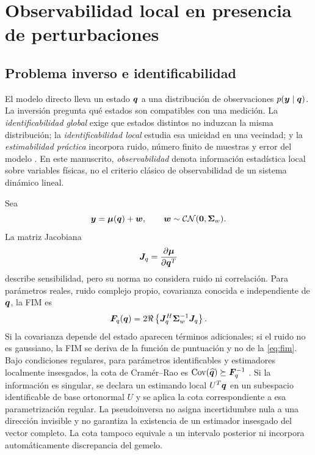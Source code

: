 \section{Observabilidad local en presencia de perturbaciones}

\subsection{Problema inverso e identificabilidad}

El modelo directo lleva un estado $\bm{q}$ a una distribución de observaciones $p(\bm{y}\mid\bm{q})$. La inversión pregunta qué estados son compatibles con una medición. La \emph{identificabilidad global} exige que estados distintos no induzcan la misma distribución; la \emph{identificabilidad local} estudia esa unicidad en una vecindad; y la \emph{estimabilidad práctica} incorpora ruido, número finito de muestras y error del modelo \citep{KaipioSomersalo2005,Kay1993}. En este manuscrito, \emph{observabilidad} denota información estadística local sobre variables físicas, no el criterio clásico de observabilidad de un sistema dinámico lineal.

Sea
\begin{equation}
\bm{y}=\bm{\mu}(\bm{q})+\bm{w},
\qquad
\bm{w}\sim\mathcal{CN}(\bm{0},\bm{\Sigma}_w).
\label{eq:local_observation}
\end{equation}
La matriz Jacobiana
\begin{equation}
\bm{J}_q=\frac{\partial\bm{\mu}}{\partial\bm{q}^T}
\label{eq:state_jacobian}
\end{equation}
describe sensibilidad, pero su norma no considera ruido ni correlación. Para parámetros reales, ruido complejo propio, covarianza conocida e independiente de $\bm{q}$, la \ac{FIM} es
\begin{equation}
\bm{F}_q(\bm{q})
=2\Re\left\{
\bm{J}_q^H\bm{\Sigma}_w^{-1}\bm{J}_q
\right\}.
\label{eq:fim}
\end{equation}
Si la covarianza depende del estado aparecen términos adicionales; si el ruido no es gaussiano, la FIM se deriva de la función de puntuación y no de la \cref{eq:fim}. Bajo condiciones regulares, para parámetros identificables y estimadores localmente
insesgados, la cota de Cramér--Rao es
$\operatorname{Cov}(\widehat{\bm{q}})\succeq\bm{F}_q^{-1}$
\citep{Kay1993}. Si la información es singular, se declara un estimando local
$U^T\bm{q}$ en un subespacio identificable de base ortonormal $U$ y se aplica
la cota correspondiente a esa parametrización regular. La pseudoinversa no
asigna incertidumbre nula a una dirección invisible y no garantiza la existencia
de un estimador insesgado del vector completo. La cota tampoco equivale a un
intervalo posterior ni incorpora automáticamente discrepancia del gemelo.


